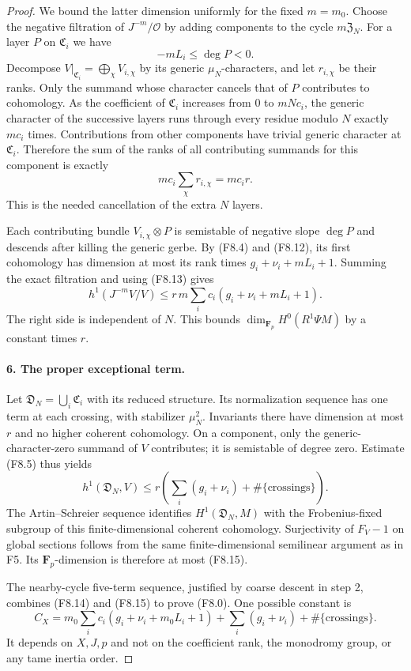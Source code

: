 \begin{proof}
We bound the latter dimension uniformly for the fixed $m=m_0$.
Choose the negative filtration of $J^{-m}/\mathcal O$ by adding
components to the cycle $m\mathfrak Z_N$. For a layer $P$ on
$\mathfrak C_i$ we have
\[
 -mL_i\leq\deg P<0.
 \tag{F8.12}
\]
Decompose $V|_{\mathfrak C_i}=\bigoplus_{\chi}V_{i,\chi}$ by its
generic $\mu_N$-characters, and let $r_{i,\chi}$ be their ranks.
Only the summand whose character cancels that of $P$ contributes
to cohomology. As the coefficient of $\mathfrak C_i$ increases
from $0$ to $mNc_i$, the generic character of the successive
layers runs through every residue modulo $N$ exactly $mc_i$
times. Contributions from other components have trivial generic
character at $\mathfrak C_i$. Therefore the sum of the ranks of
all contributing summands for this component is exactly
\[
 mc_i\sum_\chi r_{i,\chi}=mc_i r.
 \tag{F8.13}
\]
This is the needed cancellation of the extra $N$ layers.

Each contributing bundle $V_{i,\chi}\otimes P$ is semistable of
negative slope $\deg P$ and descends after killing the generic
gerbe. By (F8.4) and (F8.12), its first cohomology has dimension
at most its rank times $g_i+\nu_i+mL_i+1$. Summing the exact
filtration and using (F8.13) gives
\[
 h^1(J^{-m}V/V)
 \leq r\,m\sum_i c_i(g_i+\nu_i+mL_i+1).
 \tag{F8.14}
\]
The right side is independent of $N$. This bounds
$\dim_{\mathbf F_p}H^0(R^1\Psi M)$ by a constant times $r$.

\paragraph{6. The proper exceptional term.}
Let $\mathfrak D_N=\bigcup_i\mathfrak C_i$ with its reduced
structure. Its normalization sequence has one term at each crossing,
with stabilizer $\mu_N^2$. Invariants there have dimension at most
$r$ and no higher coherent cohomology. On a component, only the
generic-character-zero summand of $V$ contributes; it is semistable
of degree zero. Estimate (F8.5) thus yields
\[
 h^1(\mathfrak D_N,V)
 \leq r\left(\sum_i(g_i+\nu_i)+\#\{\text{crossings}\}\right).
 \tag{F8.15}
\]
The Artin--Schreier sequence identifies
$H^1(\mathfrak D_N,M)$ with the Frobenius-fixed subgroup of this
finite-dimensional coherent cohomology. Surjectivity of $F_V-1$
on global sections follows from the same finite-dimensional
semilinear argument as in F5. Its $\mathbf F_p$-dimension is
therefore at most (F8.15).

The nearby-cycle five-term sequence, justified by coarse descent
in step 2, combines (F8.14) and (F8.15) to prove (F8.0). One possible
constant is
\[
 C_X=m_0\sum_i c_i(g_i+\nu_i+m_0L_i+1)
            +\sum_i(g_i+\nu_i)+\#\{\text{crossings}\}.
\]
It depends on $X,J,p$ and not on the coefficient rank, the monodromy
group, or any tame inertia order.
\end{proof}

